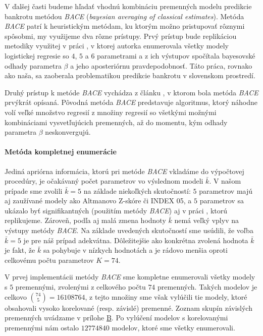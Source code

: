 V ďalšej časti budeme hľadať vhodnú kombináciu premenných modelu predikcie bankrotu metódou \emph{BACE} (\emph{bayesian averaging of classical estimates}).
Metóda \emph{BACE} patrí k heuristickým metódam, ku ktorým možno pristupovať rôznymi spôsobmi, my využijeme dva rôzne prístupy.
Prvý prístup bude replikáciou metodiky využitej v práci \cite{ondrusekova}, v ktorej autorka enumerovala všetky modely logistickej regresie so \(4\), \(5\) a \(6\) parametrami
a z ich výstupov spočítala bayesovské odhady parametra \(\beta\) a jeho aposteriórnu pravdepodobnosť.
Táto práca, rovnako ako naša, sa zaoberala problematikou predikcie bankrotu v slovenskom prostredí.

Druhý prístup k metóde \emph{BACE} vychádza z článku \cite{sala-i-martin}, v ktorom bola metóda \emph{BACE} prvýkrát opísaná.
Pôvodná metóda \emph{BACE} predstavuje algoritmus, ktorý náhodne volí veľké množstvo regresií z množiny regresií so všetkými možnými kombináciami vysvetľujúcich premenných,
až do momentu, kým odhady parametra \(\beta\) neskonvergujú.

\paragraph{Metóda kompletnej enumerácie}
\label{model_bace_1}

Jediná apriórna informácia, ktorú pri metóde \emph{BACE} vkladáme do výpočtovej procedúry, je očakávaný počet parametrov vo výslednom modeli \( \bar{k} \).
V našom prípade sme zvolili \( \bar{k} = 5 \) na základe niekoľkých skutočností: \(5\) parametrov majú aj zaužívané modely ako Altmanovo Z-skóre či INDEX 05,
a \(5\) parametrov sa ukázalo byť signifikantných (použitím metódy \emph{BACE}) aj v práci \cite{ondrusekova}, ktorú replikujeme.
Zároveň, podľa \cite{sala-i-martin} aj \cite{polaci} malá zmena hodnoty \( \bar{k} \) nemá veľký vplyv na výstupy metódy \emph{BACE}.
Na základe uvedených skutočností sme usúdili, že voľba \( \bar{k} = 5 \) je pre náš prípad adekvátna.
Dôležitejšie ako konkrétna zvolená hodnota \( \bar{k} \) je fakt, že \( \bar{k} \) sa pohybuje v nízkych hodnotách a je rádovo menšia oproti celkovému počtu parametrov \( K = 74 \).

V prvej implementácii metódy \emph{BACE} sme kompletne enumerovali všetky modely s \(5\) premennými, zvolenými z celkového počtu \(74\) premenných.
Takých modelov je celkovo \(\binom{74}{5} = 16108764\), z tejto množiny sme však vylúčili tie modely, ktoré obsahovali vysoko korelované (resp. závislé) premenné.
Zoznam skupín závislých premenných uvádzame v prílohe \hyperref[appendix:b]{B}. 
Po vylúčení modelov s korelovanými premennými nám ostalo \(12774840\) modelov, ktoré sme všetky enumerovali.

